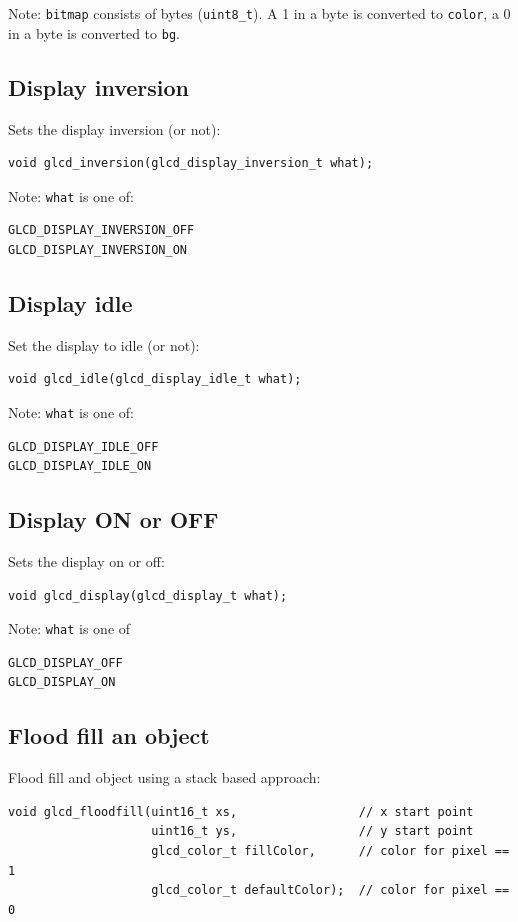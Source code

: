 \documentclass[12pt]{article}
\begin{document}
Note: \lstinline|bitmap| consists of bytes (\lstinline|uint8_t|). A 1 in a byte is converted to \lstinline|color|, a 0 in a byte is converted to \lstinline|bg|.

\subsection{Display inversion}
Sets the display inversion (or not):
\begin{lstlisting}
void glcd_inversion(glcd_display_inversion_t what);
\end{lstlisting}

Note: \lstinline|what| is one of:
\begin{lstlisting}
GLCD_DISPLAY_INVERSION_OFF
GLCD_DISPLAY_INVERSION_ON
\end{lstlisting}

\subsection{Display idle}
Set the display to idle (or not):
\begin{lstlisting}
void glcd_idle(glcd_display_idle_t what);
\end{lstlisting}

Note: \lstinline|what| is one of:

\begin{lstlisting}
GLCD_DISPLAY_IDLE_OFF
GLCD_DISPLAY_IDLE_ON
\end{lstlisting}

\subsection{Display ON or OFF}
Sets the display on or off:
\begin{lstlisting}
void glcd_display(glcd_display_t what);
\end{lstlisting}

Note: \lstinline|what| is one of

\begin{lstlisting}
GLCD_DISPLAY_OFF
GLCD_DISPLAY_ON
\end{lstlisting}

\subsection{Flood fill an object}
Flood fill and object using a stack based approach:
\begin{lstlisting}
void glcd_floodfill(uint16_t xs,                 // x start point
                    uint16_t ys,                 // y start point
                    glcd_color_t fillColor,      // color for pixel == 1
                    glcd_color_t defaultColor);  // color for pixel == 0
\end{lstlisting}
\end{document}
